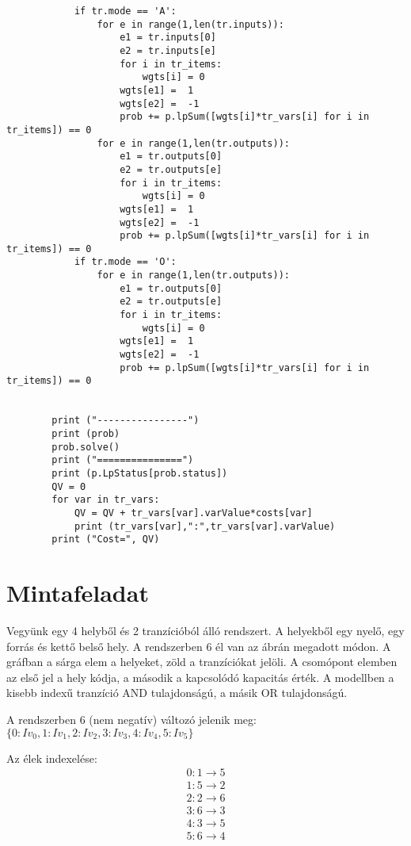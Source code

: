 \documentclass[12pt,a4paper]{book}
\begin{document}
\begin{verbatim}
            if tr.mode == 'A':
                for e in range(1,len(tr.inputs)):
                    e1 = tr.inputs[0]
                    e2 = tr.inputs[e]
                    for i in tr_items:
                        wgts[i] = 0
                    wgts[e1] =  1
                    wgts[e2] =  -1
                    prob += p.lpSum([wgts[i]*tr_vars[i] for i in tr_items]) == 0
                for e in range(1,len(tr.outputs)):
                    e1 = tr.outputs[0]
                    e2 = tr.outputs[e]
                    for i in tr_items:
                        wgts[i] = 0
                    wgts[e1] =  1
                    wgts[e2] =  -1
                    prob += p.lpSum([wgts[i]*tr_vars[i] for i in tr_items]) == 0
            if tr.mode == 'O':
                for e in range(1,len(tr.outputs)):
                    e1 = tr.outputs[0]
                    e2 = tr.outputs[e]
                    for i in tr_items:
                        wgts[i] = 0
                    wgts[e1] =  1
                    wgts[e2] =  -1
                    prob += p.lpSum([wgts[i]*tr_vars[i] for i in tr_items]) == 0
                    
            
        print ("----------------")
        print (prob)
        prob.solve()
        print ("===============")
        print (p.LpStatus[prob.status])
        QV = 0
        for var in tr_vars:
            QV = QV + tr_vars[var].varValue*costs[var]
            print (tr_vars[var],":",tr_vars[var].varValue)
        print ("Cost=", QV)
\end{verbatim}
\section{Mintafeladat}
Vegyünk egy 4 helyből és 2 tranzícióból álló rendszert. A helyekből egy nyelő, egy forrás és kettő belső hely. A rendszerben 6 él van az ábrán megadott módon.  A gráfban a sárga elem a helyeket, zöld a tranzíciókat jelöli. A csomópont elemben az első jel a hely kódja, a második a kapcsolódó kapacitás érték. A modellben a kisebb indexű tranzíció AND tulajdonságú, a másik OR tulajdonságú. 

A rendszerben 6 (nem negatív) változó jelenik meg:  $\{0: Iv_0, 1: Iv_1, 2: Iv_2, 3: Iv_3, 4: Iv_4, 5: Iv_5\}$

Az élek indexelése:
\begin{align*}
0  :  1 \rightarrow 5  \\
1  :  5 \rightarrow 2  \\
2  :  2 \rightarrow 6  \\
3  :  6 \rightarrow 3  \\
4  :  3 \rightarrow 5  \\
5  :  6 \rightarrow 4 
\end{align*}
\end{document}
